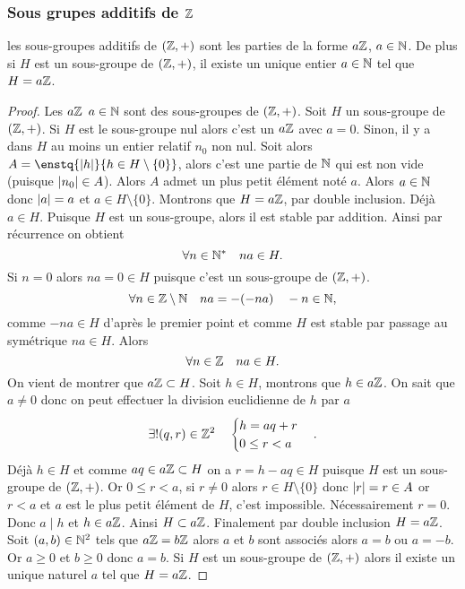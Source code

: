 \subsubsection{Sous grupes additifs de $\mathbb{Z}$}

\begin{theo}
  les sous-groupes additifs de $(\mathbb{Z},+)$ sont les parties de la forme $a\mathbb{Z}$, $a \in \mathbb{N}$. De plus si $H$ est un sous-groupe de $(\mathbb{Z},+)$, il existe un unique entier $a \in \mathbb{N}$ tel que $H=a\mathbb{Z}$.
\end{theo}
\begin{proof}
  Les $a\mathbb{Z}$ $a \in \mathbb{N}$ sont des sous-groupes de $(\mathbb{Z},+)$. Soit $H$ un sous-groupe de $(\mathbb{Z},+)$. Si $H$ est le sous-groupe nul alors c'est un $a\mathbb{Z}$ avec $a=0$. Sinon, il y a dans $H$ au moins un entier relatif $n_0$ non nul. Soit alors $A=\enstq{\abs{h}}{h \in H\setminus\{0\}}$, alors c'est une partie de $\mathbb{N}$ qui est non vide (puisque $\left\lvert n_0\right\rvert \in A$). Alors $A$ admet un plus petit élément noté $a$. Alors $a \in \mathbb{N}$ donc $\left\lvert a\right\rvert=a$ et $a \in H\setminus\{0\}$. Montrons que $H=a\mathbb{Z}$, par double inclusion. Déjà $a \in H$. Puisque $H$ est un sous-groupe, alors il est stable par addition. Ainsi par récurrence on obtient
\begin{equation}
  \forall n \in \mathbb{N}^* \quad na \in H.
\end{equation}
Si $n=0$ alors $na=0 \in H$ puisque c'est un sous-groupe de $(\mathbb{Z},+)$. %
\begin{equation}
  \forall n \in \mathbb{Z}\setminus\mathbb{N} \quad na=-(-na) \quad -n \in \mathbb{N},
\end{equation}
comme $-na \in H$ d'après le premier point et comme $H$ est stable par passage au symétrique $na \in H$. Alors
\begin{equation}
  \forall n \in \mathbb{Z} \quad na \in H.
\end{equation}
On vient de montrer que $a\mathbb{Z} \subset H$. Soit $h \in H$, montrons que $h \in a\mathbb{Z}$. On sait que $a \neq 0$ donc on peut effectuer la division euclidienne de $h$ par $a$
\begin{equation}
  \exists! (q,r) \in \mathbb{Z}^2 \quad \begin{cases} h=aq+r \\ 0 \leq r < a \end{cases}.
\end{equation}
Déjà $h \in H$ et comme $aq \in a\mathbb{Z} \subset H$ on a $r=h-aq \in H$ puisque $H$ est un sous-groupe de $(\mathbb{Z},+)$. Or $0 \leq r < a$, si $r \neq 0$ alors $r \in H\setminus\{0\}$ donc $\left\lvert r\right\rvert=r \in A$ or $r < a$ et $a$ est le plus petit élément de $H$, c'est impossible. Nécessairement $r=0$. Donc $a\mid h$ et $h \in a\mathbb{Z}$. Ainsi $H \subset a\mathbb{Z}$. Finalement par double inclusion $H=a\mathbb{Z}$. Soit $(a,b) \in \mathbb{N}^2$ tels que $a\mathbb{Z}=b\mathbb{Z}$ alors $a$ et $b$ sont associés alors $a=b$ ou $a=-b$. Or $a \geq 0$ et $b \geq 0$ donc $a=b$. Si $H$ est un sous-groupe de $(\mathbb{Z},+)$ alors il existe un unique naturel $a$ tel que $H=a\mathbb{Z}$.
\end{proof}

